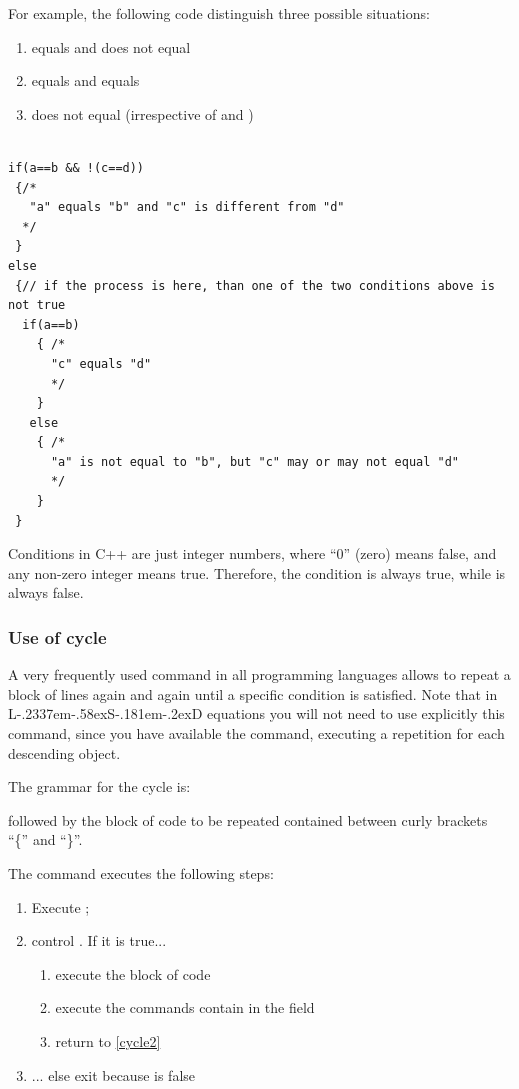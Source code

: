 \documentclass [11pt,a4paper] {book}
\def\LsD{{L\kern-.2337em\lower-.58ex\hbox{S}\kern-.181em\lower-.2ex\hbox{D}}\xspace}
\begin{document}
For example, the following code distinguish three possible situations:

\begin{enumerate}
  \item {} equals  and  does not equal 
  \item {} equals  and  equals 
  \item {} does not equal  (irrespective of  and )
\end{enumerate}


\small
\begin{verbatim}

if(a==b && !(c==d))
 {/*
   "a" equals "b" and "c" is different from "d"
  */
 }
else
 {// if the process is here, than one of the two conditions above is not true
  if(a==b)
    { /*
      "c" equals "d"
      */
    }
   else
    { /*
      "a" is not equal to "b", but "c" may or may not equal "d"
      */
    }
 }
\end{verbatim}
\normalsize

Conditions in C++ are just integer numbers, where ``0'' (zero) means false, and any
non-zero integer means true. Therefore, the condition  is always true, while  is always false.

\subsubsection{Use of cycle } \label{fun:for}
A very frequently used command in all programming languages allows to repeat a block of lines again and again until a
specific condition is satisfied. Note that in \LsD equations you will not need to use explicitly this command, since you have available the  command, executing a repetition for each descending object. 

The grammar for the cycle  is:


 followed by the block of code to be repeated
contained between curly brackets ``\{'' and ``\}''.

The  command executes the following steps:

\begin{enumerate}
  \item Execute ;
  \item control . If it is true... \label{cycle2}
  \begin{enumerate}
    \item execute the block of code
    \item execute the commands contain in the field 
    \item return to \ref{cycle2}
  \end{enumerate}
  \item ... else exit because  is false
\end{enumerate}
\end{document}
